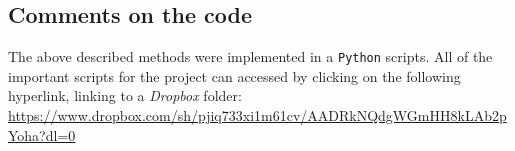 \subsection{Comments on the code}\label{sec:codecomment}
The above described methods were implemented in a \texttt{Python} scripts. All of the important scripts for the project can accessed by clicking on the following hyperlink, linking to a \emph{Dropbox} folder: \\
\url{https://www.dropbox.com/sh/pjiq733xi1m61cv/AADRkNQdgWGmHH8kLAb2pYoha?dl=0}











